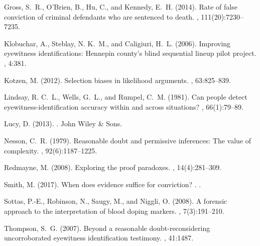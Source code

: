 \documentclass{article}
\begin{document}
\begin{thebibliography}{}
Gross, S.~R., O'Brien, B., Hu, C., and Kennedy, E.~H. (2014).
\newblock Rate of false conviction of criminal defendants who are sentenced to
  death.
,
  111(20):7230--7235.

Klobuchar, A., Steblay, N. K.~M., and Caligiuri, H.~L. (2006).
\newblock Improving eyewitness identifications: Hennepin county's blind
  sequential lineup pilot project.
, 4:381.

Kotzen, M. (2012).
\newblock Selection biases in likelihood arguments.
, 63:825--839.

Lindsay, R. C.~L., Wells, G.~L., and Rumpel, C.~M. (1981).
\newblock Can people detect eyewitness-identification accuracy within and
  across situations?
, 66(1):79--89.

Lucy, D. (2013).
.
\newblock John Wiley \& Sons.

Nesson, C.~R. (1979).
\newblock Reasonable doubt and permissive inferences: The value of complexity.
, 92(6):1187--1225.

Redmayne, M. (2008).
\newblock Exploring the proof paradoxes.
, 14(4):281--309.

Smith, M. (2017).
\newblock When does evidence suffice for conviction?
.
.

Sottas, P.-E., Robinson, N., Saugy, M., and Niggli, O. (2008).
\newblock A forensic approach to the interpretation of blood doping markers.
, 7(3):191--210.

Thompson, S.~G. (2007).
\newblock Beyond a reasonable doubt-reconsidering uncorroborated eyewitness
  identification testimony.
, 41:1487.


\end{thebibliography}
\end{document}
